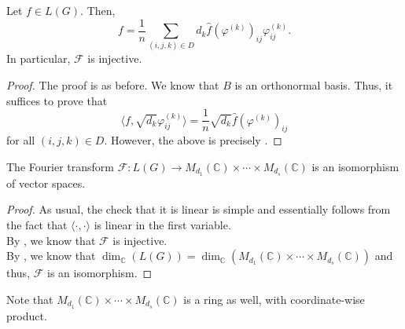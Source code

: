 \begin{thm} \label{thm:fourierinvgen}
    Let $f \in L(G).$ Then,
    \begin{equation*} 
        f = \frac{1}{n}\sum_{(i, j, k) \in D}d_k \widehat{f}(\varphi^{(k)})_{ij} \varphi^{(k)}_{ij}.    
    \end{equation*}
    In particular, $\mathcal{F}$ is injective.
\end{thm}
\begin{proof} 
    The proof is as before. We know that $B$ is an orthonormal basis. Thus, it suffices to prove that
    \begin{equation*} 
        \langle f, \sqrt{d_k}\varphi^{(k)}_{ij}\rangle = \frac{1}{n}\sqrt{d_k} \widehat{f}(\varphi^{(k)})_{ij}
    \end{equation*}
    for all $(i, j, k) \in D.$ However, the above is precisely .
\end{proof}

\begin{thm}
    The Fourier transform $\mathcal{F} : L(G) \to M_{d_1}(\mathbb{C}) \times \cdots \times M_{d_s}(\mathbb{C})$ is an isomorphism of vector spaces.
\end{thm}
\begin{proof} 
    As usual, the check that it is linear is simple and essentially follows from the fact that $\langle \cdot , \cdot \rangle$ is linear in the first variable. \\
    By , we know that $\mathcal{F}$ is injective. \\
    By , we know that $\dim_{\mathbb{C}}(L(G)) = \dim_{\mathbb{C}}(M_{d_1}(\mathbb{C}) \times \cdots \times M_{d_s}(\mathbb{C}))$ and thus, $\mathcal{F}$ is an isomorphism.
\end{proof}

Note that $M_{d_1}(\mathbb{C}) \times \cdots \times M_{d_s}(\mathbb{C})$ is a ring as well, with coordinate-wise product.

